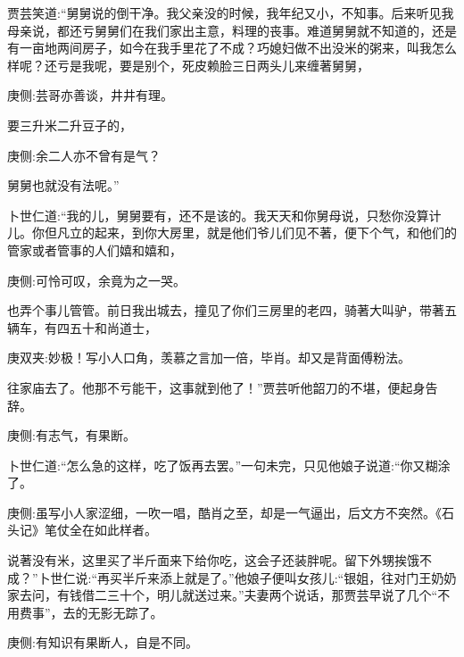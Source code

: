 \begin{parag}
    贾芸笑道:“舅舅说的倒干净。我父亲没的时候，我年纪又小，不知事。后来听见我母亲说，都还亏舅舅们在我们家出主意，料理的丧事。难道舅舅就不知道的，还是有一亩地两间房子，如今在我手里花了不成？巧媳妇做不出没米的粥来，叫我怎么样呢？还亏是我呢，要是别个，死皮赖脸三日两头儿来缠著舅舅，\begin{note}庚侧:芸哥亦善谈，井井有理。\end{note}要三升米二升豆子的，\begin{note}庚侧:余二人亦不曾有是气？\end{note}舅舅也就没有法呢。”
\end{parag}


\begin{parag}
    卜世仁道:“我的儿，舅舅要有，还不是该的。我天天和你舅母说，只愁你没算计儿。你但凡立的起来，到你大房里，就是他们爷儿们见不著，便下个气，和他们的管家或者管事的人们嬉和嬉和，\begin{note}庚侧:可怜可叹，余竟为之一哭。\end{note}也弄个事儿管管。前日我出城去，撞见了你们三房里的老四，骑著大叫驴，带著五辆车，有四五十和尚道士，\begin{note}庚双夹:妙极！写小人口角，羡慕之言加一倍，毕肖。却又是背面傅粉法。\end{note}往家庙去了。他那不亏能干，这事就到他了！”贾芸听他韶刀的不堪，便起身告辞。\begin{note}庚侧:有志气，有果断。\end{note}卜世仁道:“怎么急的这样，吃了饭再去罢。”一句未完，只见他娘子说道:“你又糊涂了。\begin{note}庚侧:虽写小人家涩细，一吹一唱，酷肖之至，却是一气逼出，后文方不突然。《石头记》笔仗全在如此样者。\end{note}说著没有米，这里买了半斤面来下给你吃，这会子还装胖呢。留下外甥挨饿不成？”卜世仁说:“再买半斤来添上就是了。”他娘子便叫女孩儿:“银姐，往对门王奶奶家去问，有钱借二三十个，明儿就送过来。”夫妻两个说话，那贾芸早说了几个“不用费事”，去的无影无踪了。\begin{note}庚侧:有知识有果断人，自是不同。\end{note}
\end{parag}



